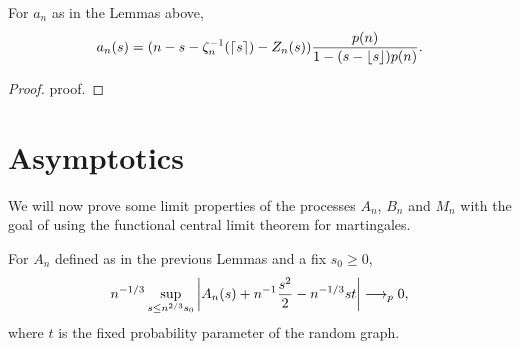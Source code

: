 \begin{lemma} \label{L: formula an}
	For $a_n$ as in the Lemmas above,
	\begin{equation}
		a_n(s) = (n - s - \zeta^{-1}_n(\lceil s\rceil) - Z_n(s)) \frac{p(n)}{1-(s-\lfloor s\rfloor)p(n)} .
	\end{equation}
\end{lemma}

\begin{proof} \label{P: formula an}
	proof.
\end{proof}


\section{Asymptotics}

We will now prove some limit properties of the processes $A_n$, $B_n$ and $M_n$ with the goal of using the functional central limit theorem for martingales.


\begin{lemma} \label{L: limit An}
	For $A_n$ defined as in the previous Lemmas and a fix $s_0 \geq 0$,
	\begin{equation} \label{E: limit An}
	n^{-1 / 3} \sup_{s \leq n^{2 / 3} s_0 } \left| A_n(s) + n^{-1}\frac{s^2}{2} - n^{-1 / 3}st \right| \longrightarrow_p 0,
	\end{equation}
	where $t$ is the fixed probability parameter of the random graph.
\end{lemma}



